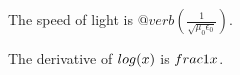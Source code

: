 The speed of light is $@verb(\frac{1}{\sqrt{\mu_0 \epsilon_0}})$.

The derivative of $\\log(x)$ is $\\frac{1}{x}$.
